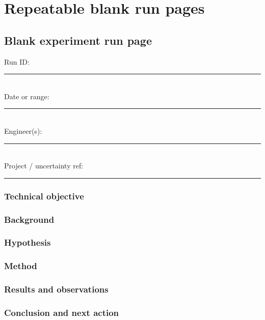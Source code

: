 \documentclass[11pt]{article}
\begin{document}
\clearpage
\section{Repeatable blank run pages}
\subsection{Blank experiment run page}

Run ID: \rule{5cm}{0.4pt}\\[0.15cm]
Date or range: \rule{5cm}{0.4pt}\\[0.15cm]
Engineer(s): \rule{8cm}{0.4pt}\\[0.15cm]
Project / uncertainty ref: \rule{8cm}{0.4pt}

\subsubsection{Technical objective}
\vspace{2.3cm}

\subsubsection{Background}
\vspace{3.0cm}

\subsubsection{Hypothesis}
\vspace{1.8cm}

\subsubsection{Method}
\vspace{4.5cm}

\subsubsection{Results and observations}
\vspace{5.5cm}

\subsubsection{Conclusion and next action}
\vspace{3.2cm}

\RDEndMatter
\end{document}
